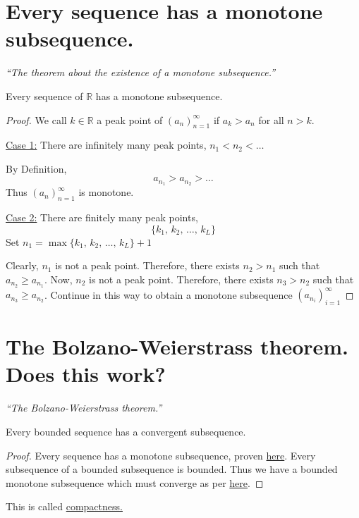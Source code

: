 \documentclass[12pt]{report}
\begin{document}
    \section{Every sequence has a monotone subsequence.}
    \label{Every sequence has a monotone subsequence}
    \textit{``The theorem about the existence of a monotone subsequence.''} \vspace{3mm}
    \begin{theorem}
        Every sequence of \(\mathbb{R}\) has a monotone subsequence.
    \end{theorem}
    \begin{proof}
        We call \(k \in \mathbb{R}\) a peak point of \(\left(a_n\right)^\infty _{n=1}\) if \(a_k > a_n\) for all \(n >k\).
        
        \underline{Case 1:}
        There are infinitely many peak points, \(n_1 < n_2 < \dots \)
        \vspace{5mm}

        By Definition,
        \[a_{n_1} > a_{n_2} > \dots\]
        Thus \(\left(a_n\right)^\infty _{n=1}\) is monotone.
        \vspace{10mm}

        \underline{Case 2:}
        There are finitely many peak points,
        \[\{k_1, \, k_2, \, \dots , \, k_L\}\]
        Set \(n_1 = \max \{k_1, \, k_2, \, \dots , \, k_L\} + 1\)

        Clearly, \(n_1\) is not a peak point. Therefore, there exists \(n_2 > n_1\) such that \(a_{n_2} \geq a_{n_1}\). Now, \(n_2\) is not a peak point. Therefore, there exists \(n_3 > n_2\) such that \(a_{n_3} \geq a_{n_2}\). Continue in this way to obtain a monotone subsequence \(\left(a_{n_i}\right)^\infty _{i=1}\)
    \end{proof}\newpage
    \section{The Bolzano-Weierstrass theorem. Does this work?}
    \textit{``The Bolzano-Weierstrass theorem.''} \vspace{3mm}
    \begin{theorem}
        Every bounded sequence has a convergent subsequence.
    \end{theorem}
    \begin{proof}
        Every sequence has a monotone subsequence, proven \hyperref[Every sequence has a monotone subsequence]{here}. Every subsequence of a bounded subsequence is bounded. Thus we have a bounded monotone subsequence which must converge as per \hyperref[Convergence of a bounded, monotone sequence]{here}.
    \end{proof}
    \begin{remark}
        This is called \underline{compactness.}
    \end{remark}
\end{document}
